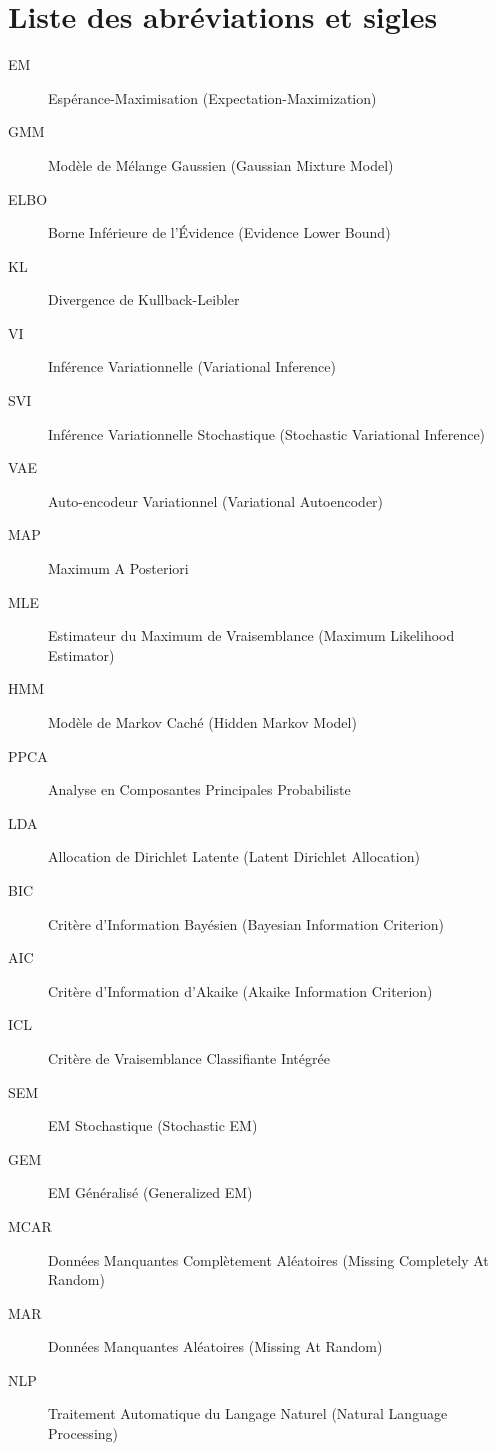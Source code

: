 \chapter*{Liste des abréviations et sigles}
\begin{description}
\item[EM] Espérance-Maximisation (Expectation-Maximization)
\item[GMM] Modèle de Mélange Gaussien (Gaussian Mixture Model)
\item[ELBO] Borne Inférieure de l'Évidence (Evidence Lower Bound)
\item[KL] Divergence de Kullback-Leibler
\item[VI] Inférence Variationnelle (Variational Inference)
\item[SVI] Inférence Variationnelle Stochastique (Stochastic Variational Inference)
\item[VAE] Auto-encodeur Variationnel (Variational Autoencoder)
\item[MAP] Maximum A Posteriori
\item[MLE] Estimateur du Maximum de Vraisemblance (Maximum Likelihood Estimator)
\item[HMM] Modèle de Markov Caché (Hidden Markov Model)
\item[PPCA] Analyse en Composantes Principales Probabiliste
\item[LDA] Allocation de Dirichlet Latente (Latent Dirichlet Allocation)
\item[BIC] Critère d'Information Bayésien (Bayesian Information Criterion)
\item[AIC] Critère d'Information d'Akaike (Akaike Information Criterion)
\item[ICL] Critère de Vraisemblance Classifiante Intégrée
\item[SEM] EM Stochastique (Stochastic EM)
\item[GEM] EM Généralisé (Generalized EM)
\item[MCAR] Données Manquantes Complètement Aléatoires (Missing Completely At Random)
\item[MAR] Données Manquantes Aléatoires (Missing At Random)
\item[NLP] Traitement Automatique du Langage Naturel (Natural Language Processing)
\end{description}


